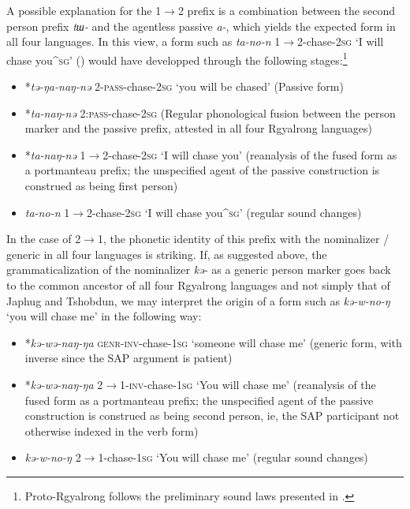 \documentclass[oneside,a4paper,11pt]{article}
\newcommand{\ipa}[1]{\mbox{\phon\textit{#1}}} %
\begin{document}
  A possible explanation for the 1$\rightarrow$2  prefix is a combination between the second person prefix \ipa{tɯ-} and the agentless passive \ipa{a-}, which yields the expected form in all four languages. In this view, a form such as \ipa{ta-no-n} 1$\rightarrow$2-chase-\textsc{2sg} `I will chase you^{\textsc{sg}}' (\citealt[219]{linxr93jiarong}) would have developped through the following stages:\footnote{Proto-Rgyalrong follows the preliminary sound laws presented in \citet{jacques04these}.}

\begin{itemize}
\item *\ipa{tə-ŋa-naŋ-nə}  2-\textsc{pass}-chase-\textsc{2sg} `you will be chased' (Passive form)
\item *\ipa{ta-naŋ-nə}  2:\textsc{pass}-chase-\textsc{2sg} (Regular phonological fusion between the person marker and the passive prefix, attested in all four Rgyalrong languages)  
\item  *\ipa{ta-naŋ-nə}  1$\rightarrow$2-chase-\textsc{2sg} `I will chase you' (reanalysis of the fused form as a portmanteau prefix; the unspecified agent of the passive construction is construed as being first person)
\item  \ipa{ta-no-n} 1$\rightarrow$2-chase-\textsc{2sg} `I will chase you^{\textsc{sg}}' (regular sound changes)
\end{itemize}


In the case of 2$\rightarrow$1, the phonetic identity of this prefix with the nominalizer / generic in all four languages is striking. If, as suggested above, the grammaticalization of the nominalizer \ipa{kə-} as a generic person marker goes back to the common ancestor of all four Rgyalrong languages and not simply that of Japhug and Tshobdun, we may interpret the origin of a form such as \ipa{kə-w-no-ŋ} `you will chase me' in the following way:


\begin{itemize}
\item *\ipa{kə-wə-naŋ-ŋa}  \textsc{genr}-\textsc{inv}-chase-\textsc{1sg} `someone will chase me' (generic form, with inverse since the SAP argument is patient)
\item  *\ipa{kə-wə-naŋ-ŋa}  2$\rightarrow$1-\textsc{inv}-chase-\textsc{1sg} `You will chase me' (reanalysis of the fused form as a portmanteau prefix; the unspecified agent of the passive construction is construed as being second person, ie, the SAP participant not otherwise indexed in the verb form)
\item  \ipa{kə-w-no-ŋ} 2$\rightarrow$1-chase-\textsc{1sg} `You will chase me'  (regular sound changes)
\end{itemize}
\end{document}
